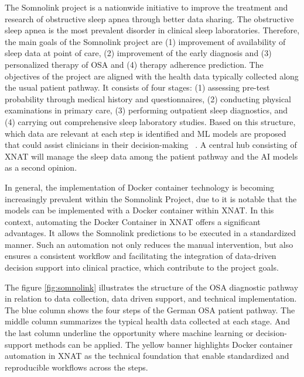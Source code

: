 The Somnolink project is a nationwide initiative to improve the treatment and research of obstructive sleep apnea through better data sharing. The obstructive sleep apnea is the most prevalent disorder in clinical sleep laboratories. Therefore, the main goals of the Somnolink project are (1) improvement of availability of sleep data at point of care, (2) improvement of the early diagnosis and (3) personalized therapy of OSA and (4) therapy adherence prediction.
The objectives of the project are aligned with the health data typically collected along the usual patient pathway. It consists of four stages: (1) assessing pre-test probability through medical history and questionnaires, (2) conducting physical examinations in primary care, (3) performing outpatient sleep diagnostics, and (4) carrying out comprehensive sleep laboratory studies. Based on this structure, which data are relevant at each step is identified and ML models are proposed that could assist clinicians in their decision-making ~\cite{krefting_somnolink_2025}. A central hub consisting of XNAT will manage the sleep data among the patient pathway and the AI models as a second opinion.

In general, the implementation of Docker container technology is becoming increasingly prevalent within the Somnolink Project, due to it is notable that the models can be implemented with a Docker container within XNAT.
In this context, automating the Docker Container in XNAT offers a significant advantages. It allows the Somnolink predictions to be executed in a standardized manner. Such an automation not only reduces the manual intervention, but also ensures a consistent  workflow and facilitating the integration of data-driven decision support into clinical practice, which contribute to the project goals.


The figure \ref{fig:somnolink} illustrates the structure of the OSA diagnostic pathway in relation to data collection, data driven support, and technical implementation.
The blue column shows the four steps of the German OSA patient pathway. The middle column summarizes the typical health data collected at each stage. And the last column underline the opportunity where machine learning or decision-support methods can be applied. 
The yellow banner highlights Docker container automation in XNAT  as the technical foundation that enable standardized and reproducible workflows across the steps.

